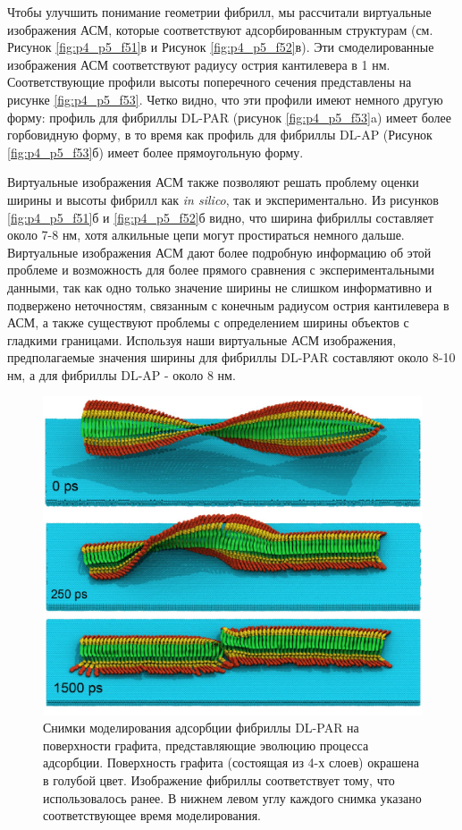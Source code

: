     Чтобы улучшить понимание геометрии фибрилл, мы рассчитали виртуальные изображения АСМ, которые соответствуют адсорбированным структурам (см. Рисунок \ref{fig:p4_p5_f51}в и Рисунок \ref{fig:p4_p5_f52}в). Эти смоделированные изображения АСМ соответствуют радиусу острия кантилевера в 1 нм. Соответствующие профили высоты поперечного сечения представлены на рисунке \ref{fig:p4_p5_f53}. Четко видно, что эти профили имеют немного другую форму: профиль для фибриллы DL-PAR (рисунок \ref{fig:p4_p5_f53}a) имеет более горбовидную форму, в то время как профиль для фибриллы DL-AP (Рисунок \ref{fig:p4_p5_f53}б) имеет более прямоугольную форму.

    Виртуальные изображения АСМ также позволяют решать проблему оценки ширины и высоты фибрилл как \textit{in silico}, так и экспериментально. Из рисунков \ref{fig:p4_p5_f51}б и \ref{fig:p4_p5_f52}б видно, что ширина фибриллы составляет около 7-8 нм, хотя алкильные цепи могут простираться немного дальше. Виртуальные изображения АСМ дают более подробную информацию об этой проблеме и возможность для более прямого сравнения с экспериментальными данными, так как одно только значение ширины не слишком информативно и подвержено неточностям, связанным с конечным радиусом острия кантилевера в АСМ, а также существуют проблемы с определением ширины объектов с гладкими границами. Используя наши виртуальные АСМ изображения, предполагаемые значения ширины для фибриллы DL-PAR составляют около 8-10 нм, а для фибриллы DL-AP - около 8 нм.


\begin{figure} [H]
    \centering
    \includegraphics[width=\textwidth]{images/p4/punkt5/part4_p5_f49.pdf}
    \caption[Снимки моделирования адсорбции фибриллы DL-PAR на поверхности графита, представляющие эволюцию процесса адсорбции]{Снимки моделирования адсорбции фибриллы DL-PAR на поверхности графита, представляющие эволюцию процесса адсорбции. Поверхность графита (состоящая из 4-х слоев) окрашена в голубой цвет. Изображение фибриллы соответствует тому, что использовалось ранее. В нижнем левом углу каждого снимка указано соответствующее время моделирования.}
    \label{fig:p4_p5_f49}
\end{figure}


